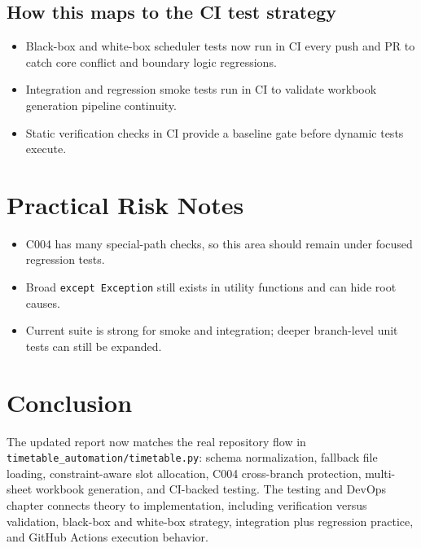 \documentclass[12pt,a4paper]{article}
\begin{document}
\subsection{How this maps to the CI test strategy}
\begin{itemize}[leftmargin=1.2cm]
  \item Black-box and white-box scheduler tests now run in CI every push and PR to catch core conflict and boundary logic regressions.
  \item Integration and regression smoke tests run in CI to validate workbook generation pipeline continuity.
  \item Static verification checks in CI provide a baseline gate before dynamic tests execute.
\end{itemize}

\section{Practical Risk Notes}
\begin{itemize}[leftmargin=1.2cm]
  \item C004 has many special-path checks, so this area should remain under focused regression tests.
  \item Broad \texttt{except Exception} still exists in utility functions and can hide root causes.
  \item Current suite is strong for smoke and integration; deeper branch-level unit tests can still be expanded.
\end{itemize}

\section*{Conclusion}
The updated report now matches the real repository flow in \texttt{timetable\_automation/timetable.py}: schema normalization, fallback file loading, constraint-aware slot allocation, C004 cross-branch protection, multi-sheet workbook generation, and CI-backed testing. The testing and DevOps chapter connects theory to implementation, including verification versus validation, black-box and white-box strategy, integration plus regression practice, and GitHub Actions execution behavior.
\end{document}
